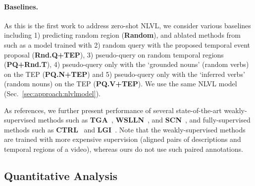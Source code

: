 \vspace{-1em}\paragraph{Baselines.}
As this is the first work to address zero-shot NLVL, we consider various baselines including 1) predicting random region (\textbf{Random}), and ablated methods from \method such as a model trained with 2) random query with the proposed temporal event proposal (\textbf{Rnd.Q+TEP}), 3) pseudo-query on random temporal regions (\textbf{PQ+Rnd.T}), 4) pseudo-query only with the `grounded nouns' (random verbs) on the TEP (\textbf{PQ.N+TEP}) and 5) pseudo-query only with the `inferred verbs' (random nouns) on the TEP (\textbf{PQ.V+TEP}). 
We use the same NLVL model (Sec.~\ref{sec:approach:nlvlmodel}).

As references, we further present performance of several state-of-the-art weakly-supervised methods such as \textbf{TGA}~\cite{tga}, \textbf{WSLLN}~\cite{wslln}, and \textbf{SCN}~\cite{scn}, and fully-supervised methods such as \textbf{CTRL}~\cite{gao2017tall} and \textbf{LGI}~\cite{mun2020LGI}.
%
Note that the weakly-supervised methods~\cite{tga,wslln,scn} are trained with more expensive supervision (aligned pairs of descriptions and temporal regions of a video), whereas ours do not use such paired annotations.


\subsection{Quantitative Analysis}
\label{sec:exp_quanti}

